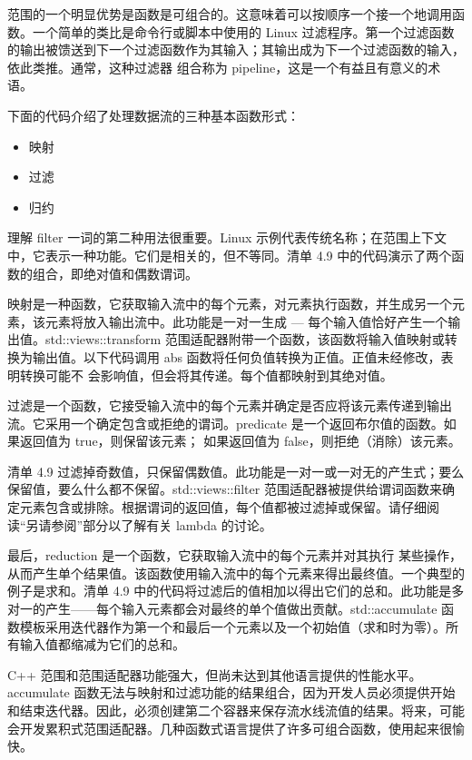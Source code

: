 范围的一个明显优势是函数是可组合的。这意味着可以按顺序一个接一个地调用函数。一个简单的类比是命令行或脚本中使用的 Linux 过滤程序。第一个过滤函数的输出被馈送到下一个过滤函数作为其输入；其输出成为下一个过滤函数的输入，依此类推。通常，这种过滤器 组合称为 pipeline，这是一个有益且有意义的术语。

下面的代码介绍了处理数据流的三种基本函数形式：

\begin{itemize}
\item
映射

\item
过滤

\item
归约
\end{itemize}

理解 filter 一词的第二种用法很重要。Linux 示例代表传统名称；在范围上下文中，它表示一种功能。它们是相关的，但不等同。清单 4.9 中的代码演示了两个函数的组合，即绝对值和偶数谓词。

映射是一种函数，它获取输入流中的每个元素，对元素执行函数，并生成另一个元素，该元素将放入输出流中。此功能是一对一生成 — 每个输入值恰好产生一个输出值。std::views::transform 范围适配器附带一个函数，该函数将输入值映射或转换为输出值。以下代码调用 abs 函数将任何负值转换为正值。正值未经修改，表明转换可能不 会影响值，但会将其传递。每个值都映射到其绝对值。

过滤是一个函数，它接受输入流中的每个元素并确定是否应将该元素传递到输出流。它采用一个确定包含或拒绝的谓词。predicate 是一个返回布尔值的函数。如果返回值为 true，则保留该元素； 如果返回值为 false，则拒绝（消除）该元素。

清单 4.9 过滤掉奇数值，只保留偶数值。此功能是一对一或一对无的产生式；要么保留值，要么什么都不保留。std::views::filter 范围适配器被提供给谓词函数来确定元素包含或排除。根据谓词的返回值，每个值都被过滤掉或保留。请仔细阅读“另请参阅”部分以了解有关 lambda 的讨论。

最后，reduction 是一个函数，它获取输入流中的每个元素并对其执行 某些操作，从而产生单个结果值。该函数使用输入流中的每个元素来得出最终值。一个典型的例子是求和。清单 4.9 中的代码将过滤后的值相加以得出它们的总和。此功能是多对一的产生——每个输入元素都会对最终的单个值做出贡献。std::accumulate 函数模板采用迭代器作为第一个和最后一个元素以及一个初始值（求和时为零）。所有输入值都缩减为它们的总和。

C++ 范围和范围适配器功能强大，但尚未达到其他语言提供的性能水平。accumulate 函数无法与映射和过滤功能的结果组合，因为开发人员必须提供开始和结束迭代器。因此，必须创建第二个容器来保存流水线流值的结果。将来，可能会开发累积式范围适配器。几种函数式语言提供了许多可组合函数，使用起来很愉快。

